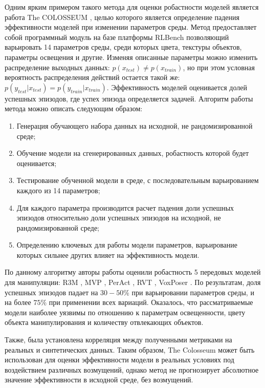         Одним ярким примером такого метода для оценки робастности моделей является работа The COLOSSEUM \cite{pumacay2024colosseum}, целью которого является определение падения эффективности моделей при изменении параметров среды. Метод предоставляет собой программный модуль на базе платформы RLBench \cite{james2020rlbench} позволяющий варьировать 14 параметров среды, среди которых цвета, текстуры объектов, параметры освещения и другие. Изменяя описанные параметры можно изменить распределение выходных данных: $p(x_{test}) \neq p(x_{train})$, но при этом условная вероятность распределения действий остается такой же: $p(y_{test} | x_{test}) = p(y_{train} | x_{train})$. Эффективность моделей оценивается долей успешных эпизодов, где успех эпизода определяется задачей. Алгоритм работы метода можно описать следующим образом:
    
        \begin{enumerate}
            \item Генерация обучающего набора данных на исходной, не рандомизированной среде;
            \item Обучение модели на сгенерированных данных, робастность которой будет оценивается;
            \item Тестирование обученной модели в среде, с последовательным варьированием каждого из 14 параметров;
            \item Для каждого параметра производится расчет падения доли успешных эпизодов относительно доли успешных эпизодов на исходной, не рандомизированной среде;
            \item Определению ключевых для работы модели параметров, варьирование которых сильнее других влияет на эффективность модели.
        \end{enumerate}
    
        По данному алгоритму авторы работы оценили робастность 5 передовых моделей для манипуляции: R3M \cite{nair2022r3m}, MVP \cite{Radosavovic2022}, PerAct \cite{shridhar2022peract}, RVT \cite{goyal2023rvt}, VoxPoser \cite{huang2023voxposer}. По результатам, доля успешных эпизодов падает на $30-50\%$ при варьировании параметров среды, и на более $75\%$ при применении всех вариаций. Оказалось, что рассматриваемые модели наиболее уязвимы по отношению к параметрам освещенности, цвету объекта манипулирования и количеству отвлекающих объектов. 

        Также, была установлена корреляция между полученными метриками на реальных и синтетических данных. Таким образом, The Colosseum может быть использован для оценки эффективности модели в реальных условиях под воздействием различных возмущений, однако метод не прогнозирует абсолютное значение эффективности в исходной среде, без возмущений. 
    
